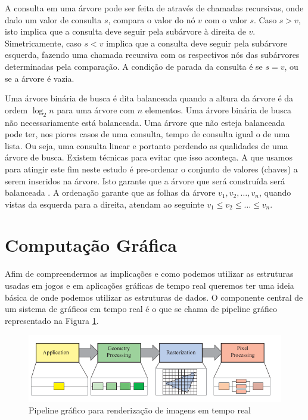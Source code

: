 A consulta em uma árvore pode ser feita de através de chamadas recursivas, onde dado um valor de consulta $s$, compara o valor do nó $v$ com o valor $s$. Caso $s > v$, isto implica que a consulta deve seguir pela subárvore à direita de $v$. Simetricamente, caso $s < v$ implica que a consulta deve seguir pela subárvore esquerda, fazendo uma chamada recursiva com os respectivos nós das subárvores determinadas pela comparação. A condição de parada da consulta é se $s = v$, ou se a árvore é vazia.

Uma árvore binária de busca é dita balanceada quando a altura da árvore é da ordem $\log_{2}{n}$ para uma árvore com $n$ elementos. Uma árvore binária de busca não necessariamente está balanceada. Uma árvore que não esteja balanceada pode ter, nos piores casos de uma consulta, tempo de consulta igual o de uma lista. Ou seja, uma consulta linear e portanto perdendo as qualidades de uma árvore de busca. Existem técnicas para evitar que isso aconteça. A que usamos para atingir este fim neste estudo é pre-ordenar o conjunto de valores (chaves) a serem inseridos na árvore. Isto garante que a árvore que será construída será balanceada \cite{cormen1}. A ordenação garante que as folhas da árvore $v_1, v_2, \dots, v_n$, quando vistas da esquerda para a direita, atendam ao seguinte $v_1 \leq v_2 \leq \dots \leq v_n$.

\section{Computação Gráfica}\label{cap:cg}
Afim de compreendermos as implicações e como podemos utilizar as estruturas usadas em jogos e em aplicações gráficas de tempo real queremos ter uma ideia básica de onde podemos utilizar as estruturas de dados. O componente central de um sistema de gráficos em tempo real é o que se chama de pipeline gráfico representado na Figura \ref{fig:graphical_pipeline}. 

\begin{figure}[h!]
    \centering
    \includegraphics[scale=0.5]{images/Captura de tela de 2021-04-16 19-23-57.png}
    \caption{\cite{rtr1} Pipeline gráfico para renderização de imagens em tempo real}
    \label{fig:graphical_pipeline}
\end{figure}

